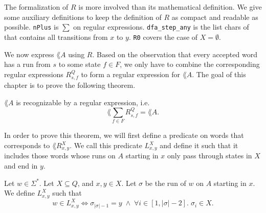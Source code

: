The formalization of $R$ is more involved than its mathematical definition. 
We give some auxiliary definitions to keep the definition of $R$ as compact and readable as possible.
\lstinline{nPlus} is $\sum$ on regular expressions.
\lstinline{dfa_step_any} is the list chars of that contains all transitions from $x$ to $y$.
\lstinline{R0} covers the case of $X=\emptyset$.


We now express $\lang{A}$ using $R$.
Based on the observation that every accepted word has a run from $s$ to some state $f \in F$, 
we only have to combine the corresponding regular expressions $R^Q_{s,f}$ to form a regular expression for $\lang{A}$.
The goal of this chapter is to prove the following theorem. 

\begin{theorem}
    \label{dfa_to_re} $\lang{A}$ is recognizable by a regular expression, i.e.
    \begin{equation*}
        \lang{\sum\limits_{f \in F} R^Q_{s,f}} = \lang{A}.
    \end{equation*}
\end{theorem}

In order to prove this theorem, we will first define a predicate on words that corresponds to $\lang{R^X_{x,y}}$.
We call this predicate $L^X_{x,y}$ and define it such that it includes those words 
whose runs on $A$ starting in $x$ only pass through states in $X$ and end in $y$.

\begin{definition}
    Let $w \in \Sigma^*$.
    Let $X \subseteq Q$, and $x,y \in X$.
    Let $\sigma$ be the run of $w$ on $A$ starting in $x$.
    We define $L^X_{x,y}$ such that
    \begin{equation*}
        w \in L^X_{x,y} \iff \sigma_{|\sigma|-1} = y \; \wedge \; \forall i \in [1,|\sigma|-2]. \; \sigma_i \in X.
    \end{equation*}
\end{definition}

